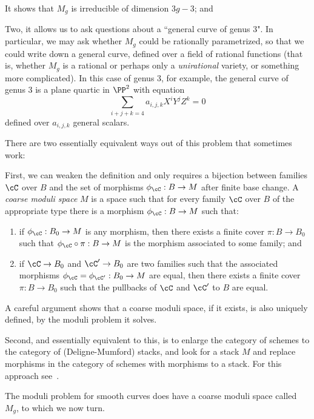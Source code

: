 It shows that $M_g$ is irreducible of dimension $3g-3$; and

Two, it allows us to ask questions about a ``general curve of genus 3". In particular, we may ask whether
$M_g$ could be rationally parametrized, so that we could write down a general curve, defined over
a field of rational functions (that is, whether $M_g$ is a rational or perhaps only a \emph{unirational} variety, or something more complicated). In this case of genus 3, for example, the general curve
of genus 3 is a plane quartic  in $\PP^2$ with equation
$$
\sum_{i+j+k = 4} a_{i,j,k} X^iY^jZ^k = 0
$$
defined over $a_{i,j,k}$ general scalars.


There are two essentially equivalent ways out of this problem that sometimes work:

First, we can weaken the definition and only requires a bijection between families $\cC$ over $B$ and the set of morphisms $\phi_\cC : B \to M$ after finite base change. A \emph{coarse moduli space} $M$ is a space such that for every family  $\cC$ over $B$ 
of the appropriate type there is a morphism $\phi_\cC : B \to M$ such that:

\begin{enumerate}
\item if $\phi_\cC : B_0 \to M$ is any morphism, then there exists a finite cover $\pi : B \to B_0$ such that $\phi_\cC \circ \pi : B \to M$ is the morphism associated to some family; and
\item if $\cC \to B_0$ and $\cC' \to B_0$ are two families such that the associated morphisms $\phi_\cC = \phi_{\cC'} : B_0 \to M$ are equal, then there exists a finite cover $\pi : B \to B_0$ such that the pullbacks of $\cC$ and $\cC'$ to $B$ are equal.
\end{enumerate}

A careful argument shows that a coarse moduli space, if it exists, is also uniquely defined, by the moduli problem it solves.

Second, and essentially equivalent to this, is to enlarge the category of schemes to the category of (Deligne-Mumford) stacks, and look for
a stack $M$ and replace morphisms in the category of schemes with morphisms to a stack. For this approach see~\cite{Deligne-Mumford}. 

The moduli problem for smooth curves does have a coarse moduli space called $M_g$, to which we now turn.




